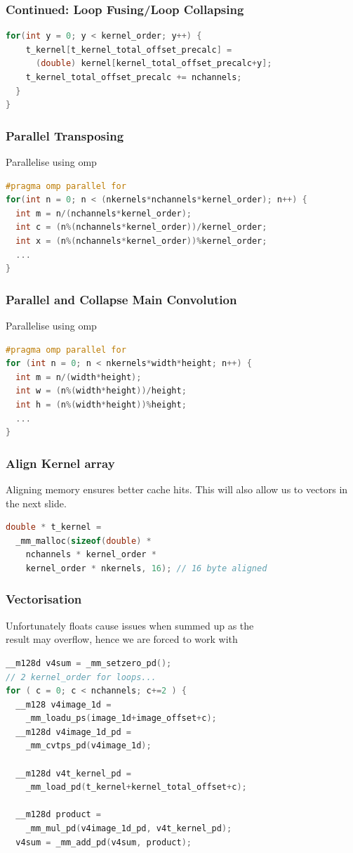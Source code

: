 \documentclass{beamer}
\begin{document}
\begin{frame}[fragile]
\frametitle{Continued: Loop Fusing/Loop Collapsing }
\begin{lstlisting}[language=C,keywordstyle=\color{blue}]
  for(int y = 0; y < kernel_order; y++) {
    t_kernel[t_kernel_total_offset_precalc] = 
      (double) kernel[kernel_total_offset_precalc+y];
    t_kernel_total_offset_precalc += nchannels;
  }
}
\end{lstlisting}
\end{frame}

\begin{frame}[fragile]
\frametitle{Parallel Transposing}
Parallelise using omp
\begin{lstlisting}[language=C,keywordstyle=\color{blue}]
#pragma omp parallel for
for(int n = 0; n < (nkernels*nchannels*kernel_order); n++) {
  int m = n/(nchannels*kernel_order);
  int c = (n%(nchannels*kernel_order))/kernel_order; 
  int x = (n%(nchannels*kernel_order))%kernel_order; 
  ...
}
\end{lstlisting}
\end{frame}

\begin{frame}[fragile]
\frametitle{Parallel and Collapse Main Convolution}
Parallelise using omp
\begin{lstlisting}[language=C,keywordstyle=\color{blue}]
#pragma omp parallel for
for (int n = 0; n < nkernels*width*height; n++) {
  int m = n/(width*height);
  int w = (n%(width*height))/height;
  int h = (n%(width*height))%height;
  ...
}
\end{lstlisting}
\end{frame}

\begin{frame}[fragile]
\frametitle{Align Kernel array}
Aligning memory ensures better cache hits. This will also
allow us to vectors in the next slide.
\begin{lstlisting}[language=C,keywordstyle=\color{blue}]
double * t_kernel = 
  _mm_malloc(sizeof(double) * 
    nchannels * kernel_order * 
    kernel_order * nkernels, 16); // 16 byte aligned
\end{lstlisting}
\end{frame}

\begin{frame}[fragile]
\frametitle{Vectorisation}
Unfortunately floats cause issues when summed up as the \\
result may overflow, hence we are forced to work with \\
\begin{lstlisting}[language=C,keywordstyle=\color{blue}]
__m128d v4sum = _mm_setzero_pd();
// 2 kernel_order for loops...
for ( c = 0; c < nchannels; c+=2 ) {
  __m128 v4image_1d = 
    _mm_loadu_ps(image_1d+image_offset+c);
  __m128d v4image_1d_pd = 
    _mm_cvtps_pd(v4image_1d);

  __m128d v4t_kernel_pd = 
    _mm_load_pd(t_kernel+kernel_total_offset+c);

  __m128d product = 
    _mm_mul_pd(v4image_1d_pd, v4t_kernel_pd);
  v4sum = _mm_add_pd(v4sum, product);

\end{lstlisting}
\end{frame}
\end{document}
